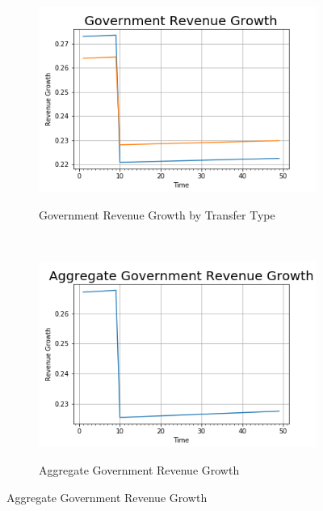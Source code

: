 \documentclass[11pt]{article}
\begin{document}
\begin{figure}[H]
      \begin{subfigure}[b]{0.5\textwidth}
        \centering
        \caption{Government Revenue Growth by Transfer Type}
        \includegraphics[width=\textwidth]{revenue_growth_tax}
        \label{fig:tax_transfer}
      \end{subfigure}%
      ~
      \begin{subfigure}[b]{0.5\textwidth}
        \centering
        \caption{Aggregate Government Revenue Growth}
        \includegraphics[width=\textwidth]{total_rev_growth_tax}
        \label{fig:tax_rev}
      \end{subfigure}
    \end{figure}
\end{document}

